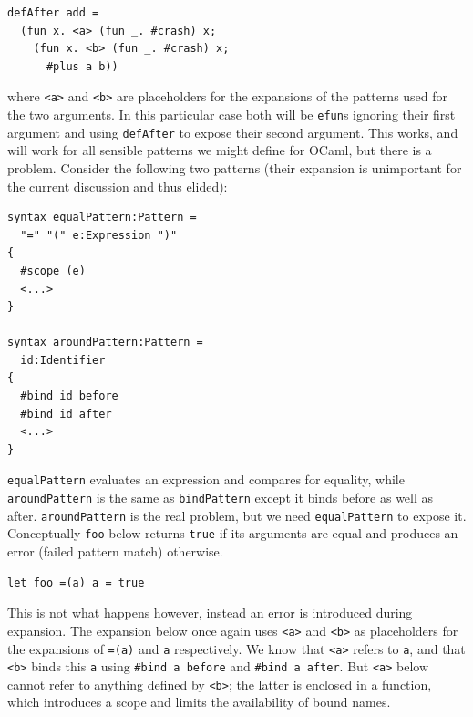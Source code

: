 \documentclass{kththesis}
\begin{document}
\begin{verbatim}
defAfter add =
  (fun x. <a> (fun _. #crash) x;
    (fun x. <b> (fun _. #crash) x;
      #plus a b))
\end{verbatim}

where \texttt{<a>} and \texttt{<b>} are placeholders for the expansions of the patterns used for the two arguments. In this particular case both will be \texttt{efun}s ignoring their first argument and using \texttt{defAfter} to expose their second argument. This works, and will work for all sensible patterns we might define for OCaml, but there is a problem. Consider the following two patterns (their expansion is unimportant for the current discussion and thus elided):

\begin{verbatim}
syntax equalPattern:Pattern =
  "=" "(" e:Expression ")"
{
  #scope (e)
  <...>
}

syntax aroundPattern:Pattern =
  id:Identifier
{
  #bind id before
  #bind id after
  <...>
}
\end{verbatim}

\texttt{equalPattern} evaluates an expression and compares for equality, while \texttt{aroundPattern} is the same as \texttt{bindPattern} except it binds before as well as after. \texttt{aroundPattern} is the real problem, but we need \texttt{equalPattern} to expose it. Conceptually \texttt{foo} below returns \texttt{true} if its arguments are equal and produces an error (failed pattern match) otherwise.

\begin{verbatim}
let foo =(a) a = true
\end{verbatim}

This is not what happens however, instead an error is introduced during expansion. The expansion below once again uses \texttt{<a>} and \texttt{<b>} as placeholders for the expansions of \texttt{=(a)} and \texttt{a} respectively. We know that \texttt{<a>} refers to \texttt{a}, and that \texttt{<b>} binds this \texttt{a} using \texttt{#bind a before} and \texttt{#bind a after}. But \texttt{<a>} below cannot refer to anything defined by \texttt{<b>}; the latter is enclosed in a function, which introduces a scope and limits the availability of bound names.
\end{document}
